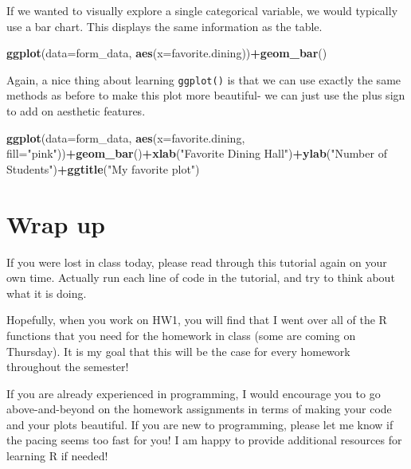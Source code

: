 \documentclass[
]{article}
\newenvironment{Shaded}{\begin{snugshade}}{\end{snugshade}}
\newcommand{\AttributeTok}[1]{\textcolor[rgb]{0.13,0.29,0.53}{#1}}
\newcommand{\FunctionTok}[1]{\textcolor[rgb]{0.13,0.29,0.53}{\textbf{#1}}}
\newcommand{\NormalTok}[1]{#1}
\newcommand{\SpecialCharTok}[1]{\textcolor[rgb]{0.81,0.36,0.00}{\textbf{#1}}}
\newcommand{\StringTok}[1]{\textcolor[rgb]{0.31,0.60,0.02}{#1}}
\begin{document}
If we wanted to visually explore a single categorical variable, we would
typically use a bar chart. This displays the same information as the
table.

\begin{Shaded}
\begin{Highlighting}[]
\FunctionTok{ggplot}\NormalTok{(}\AttributeTok{data=}\NormalTok{form\_data, }\FunctionTok{aes}\NormalTok{(}\AttributeTok{x=}\NormalTok{favorite.dining))}\SpecialCharTok{+}\FunctionTok{geom\_bar}\NormalTok{()}
\end{Highlighting}
\end{Shaded}

Again, a nice thing about learning \texttt{ggplot()} is that we can use
exactly the same methods as before to make this plot more beautiful- we
can just use the plus sign to add on aesthetic features.

\begin{Shaded}
\begin{Highlighting}[]
\FunctionTok{ggplot}\NormalTok{(}\AttributeTok{data=}\NormalTok{form\_data, }\FunctionTok{aes}\NormalTok{(}\AttributeTok{x=}\NormalTok{favorite.dining, }\AttributeTok{fill=}\StringTok{"pink"}\NormalTok{))}\SpecialCharTok{+}\FunctionTok{geom\_bar}\NormalTok{()}\SpecialCharTok{+}\FunctionTok{xlab}\NormalTok{(}\StringTok{"Favorite Dining Hall"}\NormalTok{)}\SpecialCharTok{+}\FunctionTok{ylab}\NormalTok{(}\StringTok{"Number of Students"}\NormalTok{)}\SpecialCharTok{+}\FunctionTok{ggtitle}\NormalTok{(}\StringTok{"My favorite plot"}\NormalTok{)}
\end{Highlighting}
\end{Shaded}

\section{Wrap up}\label{wrap-up}

If you were lost in class today, please read through this tutorial again
on your own time. Actually run each line of code in the tutorial, and
try to think about what it is doing.

Hopefully, when you work on HW1, you will find that I went over all of
the R functions that you need for the homework in class (some are coming
on Thursday). It is my goal that this will be the case for every
homework throughout the semester!

If you are already experienced in programming, I would encourage you to
go above-and-beyond on the homework assignments in terms of making your
code and your plots beautiful. If you are new to programming, please let
me know if the pacing seems too fast for you! I am happy to provide
additional resources for learning R if needed!
\end{document}

